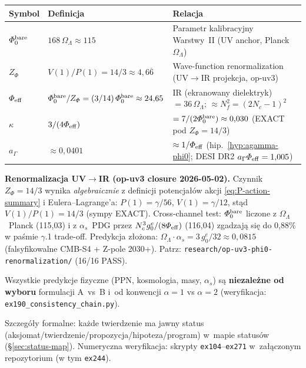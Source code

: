 \begin{center}\small
\renewcommand{\arraystretch}{1.3}
\begin{tabular}{@{}lll@{}}
\toprule
\textbf{Symbol} & \textbf{Definicja} & \textbf{Relacja} \\
\midrule
$\Phi_0^{\rm bare}$ & $168\,\Omega_\Lambda \approx 115$
  & Parametr kalibracyjny Warstwy~II (UV anchor, Planck $\Omega_\Lambda$) \\
$Z_\Phi$ & $V(1)/P(1) = 14/3 \approx 4{,}6\overline{6}$
  & Wave-function renormalization (UV$\to$IR projekcja, op-uv3) \\
$\Phi_{\rm eff}$ & $\Phi_0^{\rm bare}/Z_\Phi = (3/14)\,\Phi_0^{\rm bare} \approx 24{,}65$
  & IR (ekranowany dielektryk) $= 36\,\Omega_\Lambda$; $\approx N_f^2 = (2N_c-1)^2$ \\
$\kappa$ & $3/(4\Phi_{\rm eff})$
  & $= 7/(2\Phi_0^{\rm bare}) \approx 0{,}030$ (EXACT pod $Z_\Phi = 14/3$) \\
$a_\Gamma$ & $\approx 0{,}0401$
  & $\approx 1/\Phi_{\rm eff}$ (hip.~\ref{hyp:agamma-phi0}; DESI DR2 $a_\Gamma\Phi_{\rm eff} = 1{,}005$) \\
\bottomrule
\end{tabular}
\end{center}

\noindent\textbf{Renormalizacja UV$\to$IR (op-uv3 closure 2026-05-02).}
Czynnik $Z_\Phi = 14/3$ wynika \emph{algebraicznie} z definicji
potencja\l{}\'ow akcji \eqref{eq:P-action-summary} i Eulera--Lagrange'a:
$P(1) = \gamma/56$, $V(1) = \gamma/12$, st\k{a}d $V(1)/P(1) = 14/3$
(sympy EXACT). Cross-channel test: $\Phi_0^{\rm bare}$ liczone z
$\Omega_\Lambda$~Planck (115{,}03) i z $\alpha_s$~PDG przez
$N_c^3 g_0^e/(8\Phi_{\rm eff})$ (116{,}04) zgadzaj\k{a} si\k{e} do
0{,}88\% w pa\'smie $\gamma$.1 trade-off. Predykcja z\l{}o\.zona:
$\Omega_\Lambda \cdot \alpha_s = 3\,g_0^e/32 \approx 0{,}0815$
(falsyfikowalne CMB-S4 + Z-pole 2030+).
Patrz: \texttt{research/op-uv3-phi0-renormalization/} (16/16 PASS).

\noindent
Wszystkie predykcje fizyczne (PPN, kosmologia, masy, $\alpha_s$)
s\k{a} \textbf{niezale\.zne od wyboru} formulacji A~vs~B
i~od konwencji $\alpha = 1$ vs $\alpha = 2$
(weryfikacja: \texttt{ex190\_consistency\_chain.py}).

\bigskip\noindent
Szczeg\'o\l{}y formalne: ka\.zde twierdzenie ma jawny status
(aksjomat/twierdzenie/propozycja/hipoteza/program)
w~mapie status\'ow (\S\ref{sec:status-map}).
Numeryczna weryfikacja: skrypty \texttt{ex104}--\texttt{ex271}
w~za\l{}\k{a}czonym repozytorium (w tym \texttt{ex244}).

\newpage
